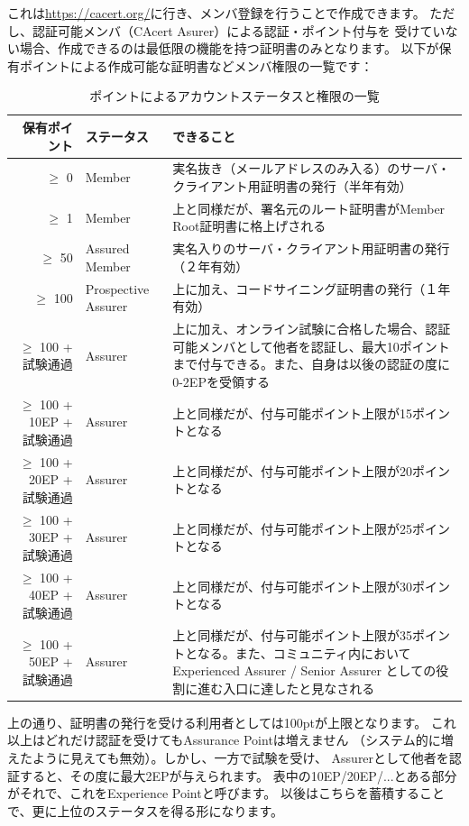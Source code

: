 \documentclass[mingoth,a4paper]{jsarticle}
\begin{document}
これは\url{https://cacert.org/}に行き、メンバ登録を行うことで作成できます。
ただし、認証可能メンバ（CAcert Asurer）による認証・ポイント付与を
受けていない場合、作成できるのは最低限の機能を持つ証明書のみとなります。
以下が保有ポイントによる作成可能な証明書などメンバ権限の一覧です：
\begin{table}[h]
\begin{center}
\begin{tabular}{|r|l|p{25em}|}
\hline
保有ポイント & ステータス & できること \\ \hline
$\geq$   0 & Member
      & 実名抜き（メールアドレスのみ入る）のサーバ・クライアント用証明書の発行（半年有効） \\ \hline
$\geq$   1 & Member
      & 上と同様だが、署名元のルート証明書がMember Root証明書に格上げされる \\ \hline
$\geq$  50 & Assured Member
      & 実名入りのサーバ・クライアント用証明書の発行（２年有効） \\ \hline
$\geq$ 100 & Prospective Assurer
      & 上に加え、コードサイニング証明書の発行（１年有効） \\ \hline
$\geq$ 100 + 試験通過 & Assurer
      & 上に加え、オンライン試験に合格した場合、認証可能メンバとして他者を認証し、最大10ポイントまで付与できる。また、自身は以後の認証の度に0-2EPを受領する \\ \hline
$\geq$ 100 + 10EP + 試験通過 & Assurer
      & 上と同様だが、付与可能ポイント上限が15ポイントとなる \\ \hline
$\geq$ 100 + 20EP + 試験通過 & Assurer
      & 上と同様だが、付与可能ポイント上限が20ポイントとなる \\ \hline
$\geq$ 100 + 30EP + 試験通過 & Assurer
      & 上と同様だが、付与可能ポイント上限が25ポイントとなる \\ \hline
$\geq$ 100 + 40EP + 試験通過 & Assurer
      & 上と同様だが、付与可能ポイント上限が30ポイントとなる \\ \hline
$\geq$ 100 + 50EP + 試験通過 & Assurer
      & 上と同様だが、付与可能ポイント上限が35ポイントとなる。また、コミュニティ内において Experienced Assurer / Senior Assurer としての役割に進む入口に達したと見なされる \\ \hline
\end{tabular}
\end{center}
\caption{ポイントによるアカウントステータスと権限の一覧}
\end{table}

上の通り、証明書の発行を受ける利用者としては100ptが上限となります。
これ以上はどれだけ認証を受けてもAssurance Pointは増えません
（システム的に増えたように見えても無効）。しかし、一方で試験を受け、
Assurerとして他者を認証すると、その度に最大2EPが与えられます。
表中の10EP/20EP/...とある部分がそれで、これをExperience Pointと呼びます。
以後はこちらを蓄積することで、更に上位のステータスを得る形になります。
\end{document}
